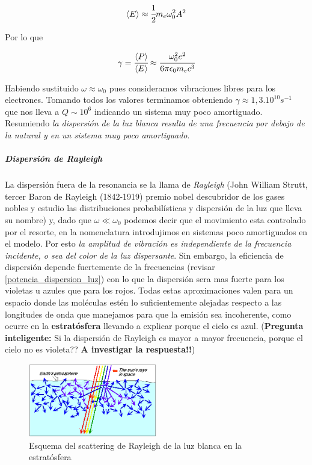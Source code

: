 \documentclass[a4paper,spanish]{article}
\numberwithin{equation}{section}
\begin{document}
\[\langle{E}\rangle \approx \cfrac{1}{2}m_e \omega_0 ^2 A^2\]


Por lo que

\begin{equation}
\gamma=\cfrac{\langle{P}\rangle}{\langle{E}\rangle} \approx \cfrac{\omega_0 ^2 e^2}{6 \pi \epsilon_0 m_e c^3}
\end{equation}

Habiendo sustituido $\omega \approx \omega_0$ pues consideramos vibraciones libres para los electrones. Tomando todos los valores terminamos obteniendo $\gamma \approx 1,3.10^{10} s^{-1}$ que nos lleva a $Q \sim 10^6$ indicando un sistema muy poco amortiguado.
Resumiendo \textit{la dispersi\'on de la luz blanca resulta de una frecuencia por debajo de la natural y en un sistema muy poco amortiguado}.

\subparagraph*{Dispersi\'on de Rayleigh}

La dispersi\'on fuera de la resonancia se la llama de \textit{Rayleigh} (John William Strutt, tercer Baron de Rayleigh (1842-1919) premio nobel descubridor de los gases nobles y estudio las distribuciones probabil\'isticas y dispersi\'on de la luz que lleva su nombre) y, dado que $\omega\ll\omega_0$ podemos decir que el movimiento esta controlado por el resorte, en la nomenclatura introdujimos en sistemas poco amortiguados en el modelo. Por esto \textit{la amplitud de vibraci\'on es independiente de la frecuencia incidente, o sea del color de la luz dispersante}. Sin embargo, la eficiencia de dispersi\'on depende fuertemente de la frecuencias (revisar \ref{potencia_dispersion_luz}) con lo que la dispersi\'on sera mas fuerte para los violetas u azules que para los rojos. Todas estas aproximaciones valen para un espacio donde las mol\'eculas est\'en lo suficientemente alejadas respecto a las longitudes de onda que manejamos para que la emisi\'on sea incoherente, como ocurre en la \textbf{estrat\'osfera} llevando a explicar porque el cielo es azul. (\textbf{Pregunta inteligente:} Si la dispersi\'on de Rayleigh es mayor a mayor frecuencia, porque el cielo no es violeta?? \textbf{A investigar la respuesta!!})

\begin{figure}[H]
  \centering
  \includegraphics[width=0.5\textwidth]{Imagenes/rayleigh_scattering.png}
  \caption{Esquema del scattering de Rayleigh de la luz blanca en la estrat\'osfera}
  \label{fig:rayleigh_scattering}
\end{figure}
\end{document}
